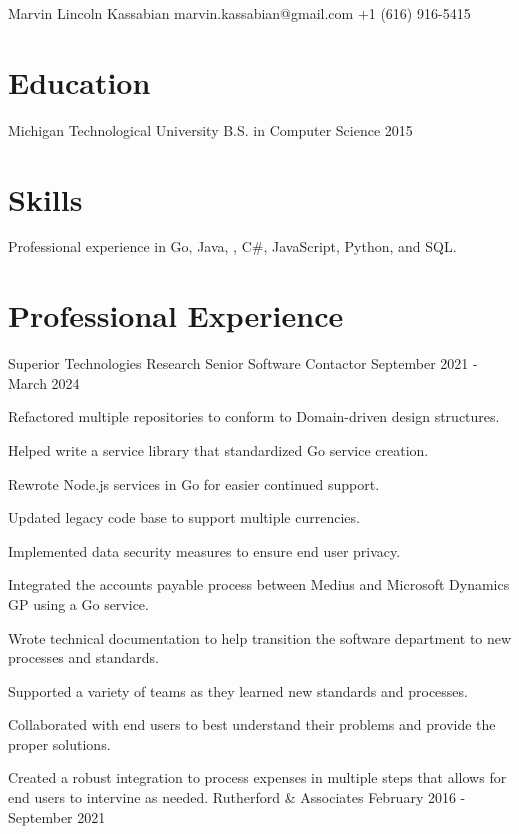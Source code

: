 \documentclass{marvinkassabian_resume}
\begin{document}
	\resumeheadersimple
			{Marvin Lincoln Kassabian}
			{marvin.kassabian@gmail.com}
			{+1 (616) 916-5415}
	\section{Education}
		\subsectionlocationdate
				{Michigan Technological University}
				{B.S. in Computer Science}
				{2015}
	\section{Skills}
		\resumesublistbegin
			\item Professional experience in Go, Java, \cpp, C\#, JavaScript, Python, and SQL.
		\resumesublistend
	\section{Professional Experience}
		\subsectionpositiondate
				{Superior Technologies Research}
				{Senior Software Contactor}
				{September 2021 - March 2024}
			\resumesublistbegin
				\item Refactored multiple repositories to conform to Domain-driven design structures.
				\item Helped write a service library that standardized Go service creation.
				\item Rewrote Node.js services in Go for easier continued support.
				\item Updated legacy code base to support multiple currencies.
				\item Implemented data security measures to ensure end user privacy.
				\item Integrated the accounts payable process between Medius and Microsoft Dynamics GP using a Go service.
				\item Wrote technical documentation to help transition the software department to new processes and standards.
				\item Supported a variety of teams as they learned new standards and processes.
				\item Collaborated with end users to best understand their problems and provide the proper solutions.
				\item Created a robust integration to process expenses in multiple steps that allows for end users to intervine as needed.
			\resumesublistend
		\subsectiondate
				{Rutherford \& Associates}
				{February 2016 - September 2021}
			\resumesublistbegin
				\item[] \subsectiondate
\end{document}
